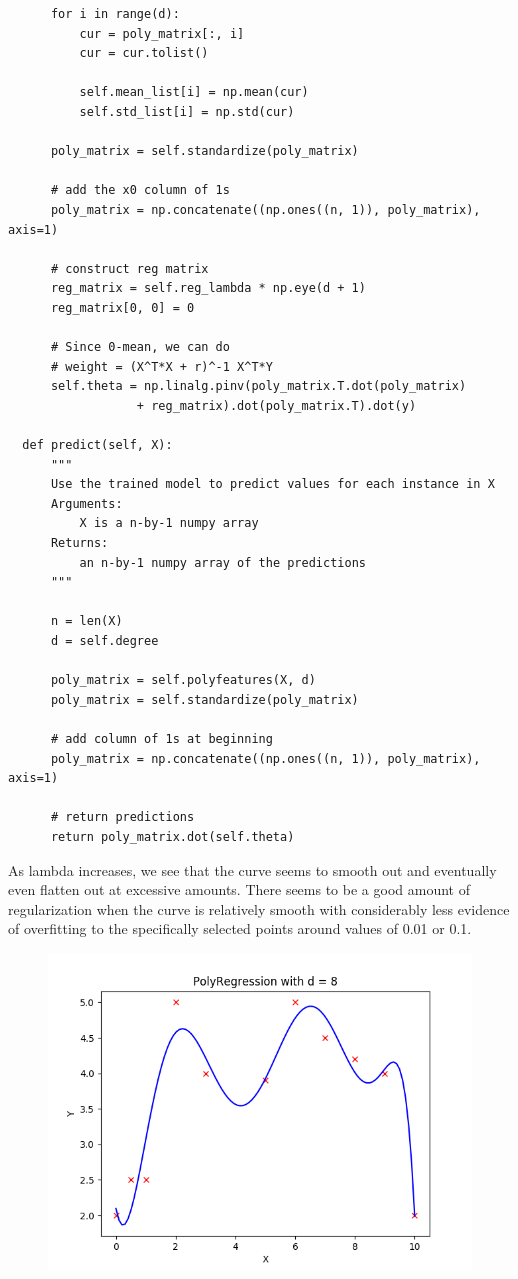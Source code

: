 \documentclass{article}
\newcommand{\1}{\mathbf{1}}
\begin{document}
{\begin{verbatim}
      for i in range(d):
          cur = poly_matrix[:, i]
          cur = cur.tolist()

          self.mean_list[i] = np.mean(cur)
          self.std_list[i] = np.std(cur)

      poly_matrix = self.standardize(poly_matrix)

      # add the x0 column of 1s
      poly_matrix = np.concatenate((np.ones((n, 1)), poly_matrix), axis=1)

      # construct reg matrix
      reg_matrix = self.reg_lambda * np.eye(d + 1)
      reg_matrix[0, 0] = 0

      # Since 0-mean, we can do 
      # weight = (X^T*X + r)^-1 X^T*Y
      self.theta = np.linalg.pinv(poly_matrix.T.dot(poly_matrix)
                  + reg_matrix).dot(poly_matrix.T).dot(y)

  def predict(self, X):
      """
      Use the trained model to predict values for each instance in X
      Arguments:
          X is a n-by-1 numpy array
      Returns:
          an n-by-1 numpy array of the predictions
      """

      n = len(X)
      d = self.degree

      poly_matrix = self.polyfeatures(X, d)
      poly_matrix = self.standardize(poly_matrix)

      # add column of 1s at beginning
      poly_matrix = np.concatenate((np.ones((n, 1)), poly_matrix), axis=1)

      # return predictions
      return poly_matrix.dot(self.theta)
\end{verbatim}

As lambda increases, we see that the curve seems to smooth out and eventually even flatten out at excessive amounts. There seems to be a good amount of regularization when the curve is relatively smooth with considerably less evidence of overfitting to the specifically selected points around values of 0.01 or 0.1.

\newpage

\begin{figure}[hb]
    \centering
    \includegraphics[width=150mm]{../hw1-code/results/a4.png}
\end{figure}

}
\end{document}
